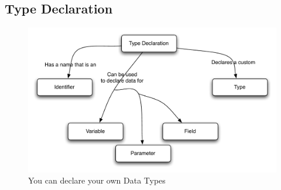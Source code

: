 \clearpage
\subsection{Type Declaration} %
\label{sub:type_declaration}

\begin{figure}[h]
   \centering
   \includegraphics[width=\textwidth]{./topics/type-decl/diagrams/TypeDecl} 
   \caption{You can declare your own Data Types}
   \label{fig:type-decl-type-decl}
\end{figure}


